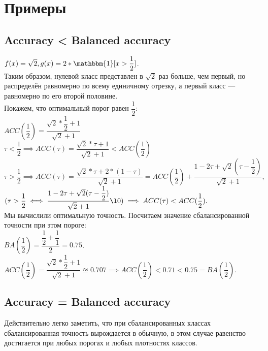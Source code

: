 \documentclass{article}
\begin{document}
\section{Примеры}
\subsection{Accuracy < Balanced accuracy}
$f(x) = \sqrt{2},\\
g(x) = 2 * \mathbbm{1}[x > \dfrac{1}{2}]$.\\
Таким образом, нулевой класс представлен в $\sqrt{2}$ раз больше, чем первый, но распределён равномерно по всему единичному отрезку, а первый класс --- равномерно по его второй половине.\\
Покажем, что оптимальный порог равен $\dfrac{1}{2}$:\\
$ACC(\dfrac{1}{2}) = \dfrac{\sqrt{2} * \dfrac{1}{2} + 1}{\sqrt{2} + 1}$\\
$\tau < \dfrac{1}{2} \implies ACC(\tau) = \dfrac{\sqrt{2} * \tau + 1}{\sqrt{2} + 1} < ACC(\dfrac{1}{2})$\\
$\tau > \dfrac{1}{2} \implies ACC(\tau) = \dfrac{\sqrt{2} * \tau + 2 * (1 - \tau)}{\sqrt{2} + 1} = ACC(\dfrac{1}{2}) + \dfrac{1 - 2 \tau + \sqrt{2}(\tau - \dfrac{1}{2})}{\sqrt{2} + 1},$\\
$(\tau > \dfrac{1}{2} \iff \dfrac{1 - 2 \tau + \sqrt{2}(\tau - \dfrac{1}{2})}{\sqrt{2} + 1} \l 0) \implies ACC(\tau) < ACC(\dfrac{1}{2}).$\\
Мы вычислили оптимальную точность. Посчитаем значение сбалансированной точности при этом пороге:\\
$BA(\dfrac{1}{2}) = \dfrac{\dfrac{1}{2} + \dfrac{1}{1}}{2} = 0.75$.\\
$ACC(\dfrac{1}{2}) = \dfrac{\sqrt{2} * \dfrac{1}{2} + 1}{\sqrt{2} + 1} \approxeq 0.707 \implies ACC(\dfrac{1}{2}) < 0.71 < 0.75 = BA(\dfrac{1}{2})$.
\subsection{Accuracy = Balanced accuracy}
Действительно легко заметить, что при сбалансированных классах сбалансированная точность вырождается в обычную, в этом случае равенство достигается при любых порогах и любых плотностях классов.
\end{document}
